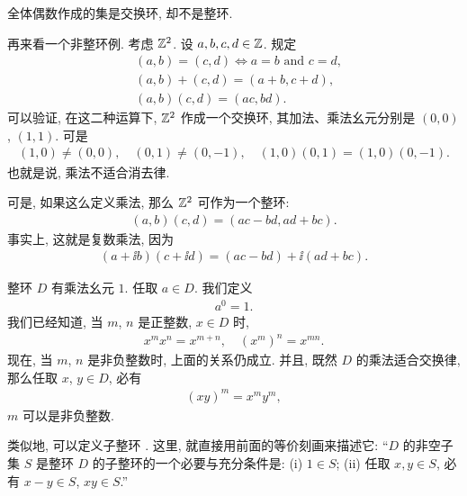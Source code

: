 \begin{example}
    全体偶数作成的集是交换环, 却不是整环.
\end{example}

\begin{example}
    再来看一个非整环例. 考虑 $\mathbb{Z}^2$. 设 $a,b,c,d \in \mathbb{Z}$. 规定
    \begin{align*}
         & (a,b) = (c,d) \iff a = b \text{ and } c = d, \\
         & (a,b) + (c,d) = (a+b,c+d),                   \\
         & (a,b)(c,d) = (ac,bd).
    \end{align*}
    可以验证, 在这二种运算下, $\mathbb{Z}^2$ 作成一个交换环, 其加法、乘法幺元分别是 $(0,0)$, $(1,1)$. 可是
    \begin{align*}
        (1,0) \neq (0,0), \quad (0,1) \neq (0,-1), \quad (1,0)(0,1) = (1,0)(0,-1).
    \end{align*}
    也就是说, 乘法不适合消去律.
\end{example}

\begin{remark}
    可是, 如果这么定义乘法, 那么 $\mathbb{Z}^2$ 可作为一个整环:
    \begin{align*}
        (a,b)(c,d) = (ac-bd,ad+bc).
    \end{align*}
    事实上, 这就是复数乘法, 因为
    \begin{align*}
        (a+ \ii b)(c+ \ii d) = (ac-bd) + \ii (ad+bc).
    \end{align*}
\end{remark}

\begin{remark}
    整环 $D$ 有乘法幺元 $1$. 任取 $a \in D$. 我们定义
    \begin{align*}
        a^0 = 1.
    \end{align*}
    我们已经知道, 当 $m$, $n$ 是正整数, $x \in D$ 时,
    \begin{align*}
        x^m x^n = x^{m+n}, \quad (x^m)^n = x^{mn}.
    \end{align*}
    现在, 当 $m$, $n$ 是非负整数时, 上面的关系仍成立. 并且, 既然 $D$ 的乘法适合交换律, 那么任取 $x$, $y \in D$, 必有
    \begin{align*}
        (xy)^m = x^m y^m,
    \end{align*}
    $m$ 可以是非负整数.
\end{remark}

\begin{remark}
    类似地, 可以定义子整环 . 这里, 就直接用前面的等价刻画来描述它: ``$D$ 的非空子集 $S$ 是整环 $D$ 的子整环的一个必要与充分条件是: (i) $1 \in S$; (ii) 任取 $x,y \in S$, 必有 $x-y \in S$, $xy \in S$.''
\end{remark}

